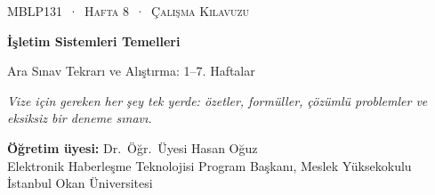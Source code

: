 \documentclass[11pt,a4paper]{article}
\begin{document}
\setlength{\emergencystretch}{3em}
\newcommand{\gantt}[2]{%
\begin{tikzpicture}[x=#1cm,y=1cm]
\foreach \p/\a/\b in {#2} {
  \fill[col\p] (\a,0) rectangle (\b,0.62);
  \draw[white,line width=1.2pt] (\a,0) -- (\a,0.62);
  \node[font=\small\bfseries,text=txt\p] at ({(\a+\b)/2},0.31) {\p};
  \draw[muted] (\a,0) -- (\a,-0.1) node[below,font=\scriptsize,text=muted,inner sep=1.5pt] {\a};
  \draw[muted] (\b,0) -- (\b,-0.1) node[below,font=\scriptsize,text=muted,inner sep=1.5pt] {\b};
}
\end{tikzpicture}}
\newcommand{\gen}[1]{}
\newcommand{\pts}[1]{\textcolor{mintdeep}{\textbf{[#1~puan]}}\enspace}

\thispagestyle{empty}
\begin{tcolorbox}[enhanced,colback=dark,colframe=dark,arc=0pt,boxrule=0pt,
  left=18pt,right=18pt,top=20pt,bottom=20pt,coltext=white]
{\small\color{mint}\textsc{MBLP131 \,·\, Hafta 8 \,·\, Çalışma Kılavuzu}}\par\medskip
{\headfont\fontsize{26}{30}\selectfont\bfseries İşletim Sistemleri Temelleri}\par\medskip
{\large Ara Sınav Tekrarı ve Alıştırma: 1--7. Haftalar}\par\smallskip
{\small\itshape\color{white!70} Vize için gereken her şey tek yerde: özetler, formüller, çözümlü problemler ve eksiksiz bir deneme sınavı.}
\end{tcolorbox}

\vspace{0.4em}
\begin{minipage}[t]{0.70\linewidth}
\small
\textbf{Öğretim üyesi:} Dr.\ Öğr.\ Üyesi Hasan Oğuz\\
Elektronik Haberleşme Teknolojisi Program Başkanı, Meslek Yüksekokulu\\
İstanbul Okan Üniversitesi
\end{minipage}
\end{document}
